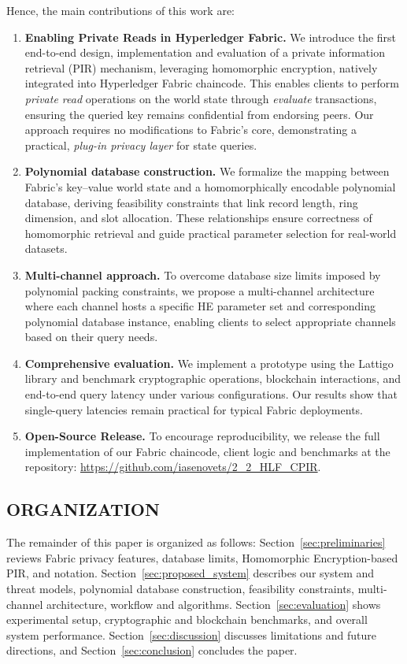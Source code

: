 \documentclass[letterpaper,journal]{IEEEtran}
\begin{document}
Hence, the main contributions of this work are:
\begin{enumerate}
    \item \textbf{Enabling Private Reads in Hyperledger Fabric.} 
    We introduce the first end-to-end design, implementation and evaluation of a private information retrieval (PIR) mechanism, 
    leveraging homomorphic encryption, natively integrated into Hyperledger Fabric chaincode. This enables clients to perform \emph{private read} 
    operations on the world state through \emph{evaluate} transactions, ensuring the queried key remains confidential from endorsing peers. 
    Our approach requires no modifications to Fabric’s core, demonstrating a practical, \emph{plug-in privacy layer} for state queries.
    \item \textbf{Polynomial database construction.}
    We formalize the mapping between Fabric’s key–value world state and a homomorphically encodable polynomial database, 
    deriving feasibility constraints that link record length, ring dimension, and slot allocation. 
    These relationships ensure correctness of homomorphic retrieval and guide practical parameter selection for real-world datasets.
    \item \textbf{Multi-channel approach.} 
    To overcome database size limits imposed by polynomial packing constraints, we propose a multi-channel architecture 
    where each channel hosts a specific HE parameter set and corresponding polynomial database instance, 
    enabling clients to select appropriate channels based on their query needs.
    \item \textbf{Comprehensive evaluation.} 
    We implement a prototype using the Lattigo~\cite{noauthor_lattigo_2024} library and benchmark cryptographic operations, 
    blockchain interactions, and end-to-end query latency under various configurations. Our results show that single-query latencies 
    remain practical for typical Fabric deployments.
    \item \textbf{Open-Source Release.} To encourage reproducibility, we release the full implementation of our Fabric 
    chaincode, client logic and benchmarks at the repository: \url{https://github.com/iasenovets/2_2_HLF_CPIR}.
\end{enumerate}

\subsection{ORGANIZATION}

The remainder of this paper is organized as follows: 
Section~\ref{sec:preliminaries} reviews Fabric privacy features, database limits, Homomorphic Encryption-based PIR, and notation.
Section~\ref{sec:proposed_system} describes our system and threat models, polynomial database construction, feasibility constraints, 
multi-channel architecture, workflow and algorithms.
Section~\ref{sec:evaluation} shows experimental setup, cryptographic and blockchain benchmarks, and overall system performance.
Section~\ref{sec:discussion} discusses limitations and future directions, and Section~\ref{sec:conclusion} concludes the paper.
\end{document}
